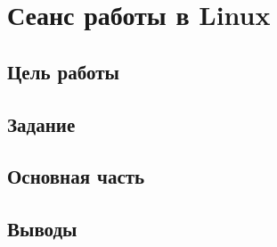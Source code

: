 \chapter{Сеанс работы в Linux}

\section{Цель работы}

\section{Задание}

\section{Основная часть}


\section{Выводы}

